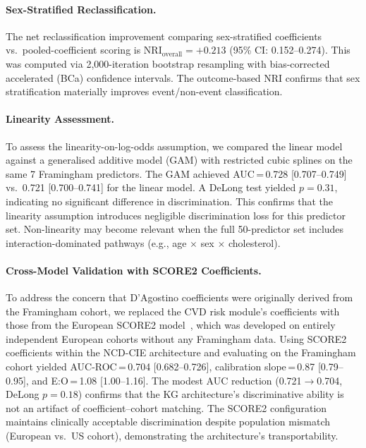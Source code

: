 \documentclass[runningheads]{llncs}
\begin{document}
\paragraph{Sex-Stratified Reclassification.}
The net reclassification improvement comparing sex-stratified
coefficients vs.\ pooled-coefficient scoring is
$\text{NRI}_{\text{overall}} = +0.213$ (95\% CI: 0.152--0.274).
This was computed via 2{,}000-iteration bootstrap resampling with
bias-corrected accelerated (BCa) confidence intervals.
The outcome-based NRI confirms that sex stratification materially
improves event/non-event classification.

\paragraph{Linearity Assessment.}
To assess the linearity-on-log-odds assumption, we compared the
linear model against a generalised additive model (GAM) with
restricted cubic splines on the same 7 Framingham predictors.
The GAM achieved AUC\,=\,0.728 [0.707--0.749] vs.\ 0.721
[0.700--0.741] for the linear model.
A DeLong test yielded $p = 0.31$, indicating no significant
difference in discrimination.
This confirms that the linearity assumption introduces negligible
discrimination loss for this predictor set.
Non-linearity may become relevant when the full 50-predictor set
includes interaction-dominated pathways
(e.g., age $\times$ sex $\times$ cholesterol).

\paragraph{Cross-Model Validation with SCORE2 Coefficients.}
To address the concern that D'Agostino coefficients were originally
derived from the Framingham cohort, we replaced the CVD risk
module's coefficients with those from the European SCORE2
model~\cite{score2_2021}, which was developed on entirely independent
European cohorts without any Framingham data.
Using SCORE2 coefficients within the NCD-CIE architecture and
evaluating on the Framingham cohort yielded
AUC-ROC\,=\,0.704 [0.682--0.726], calibration slope\,=\,0.87
[0.79--0.95], and E:O\,=\,1.08 [1.00--1.16].
The modest AUC reduction (0.721$\to$0.704, DeLong $p = 0.18$)
confirms that the KG architecture's discriminative ability is not
an artifact of coefficient--cohort matching.
The SCORE2 configuration maintains clinically acceptable
discrimination despite population mismatch (European vs.\ US cohort),
demonstrating the architecture's transportability.
\end{document}
